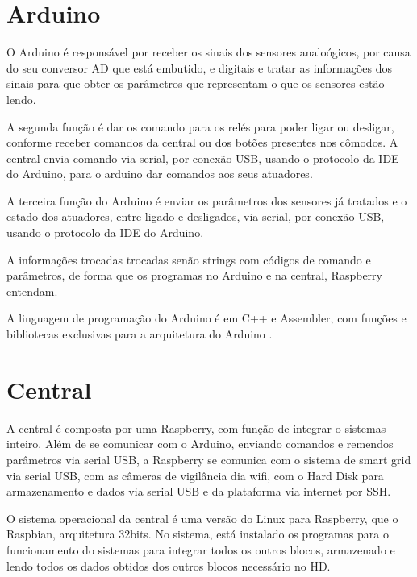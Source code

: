\section{Arduino}
\par O Arduino é responsável por receber os sinais dos sensores analoógicos, por causa do seu conversor AD que está embutido, e digitais e tratar as informações dos sinais para que obter os parâmetros que representam o que os sensores estão lendo.
\par A segunda função é dar os comando para os relés para poder ligar ou desligar, conforme receber comandos da central ou dos botões presentes nos cômodos. A central envia comando via serial, por conexão USB, usando o protocolo da IDE do Arduino, para o arduino dar comandos aos seus atuadores.
\par A terceira função do Arduino é enviar os parâmetros dos sensores já tratados e o estado dos atuadores, entre ligado e desligados, via serial, por conexão USB, usando o protocolo da IDE do Arduino.
\par A informações trocadas trocadas senão strings com códigos de comando e parâmetros, de forma que os programas no Arduino e na central, Raspberry entendam.
\par A linguagem de programação do Arduino é em C++ e Assembler, com funções e bibliotecas exclusivas para a arquitetura do Arduino .

\section{Central}
\par A central é composta por uma Raspberry, com função de integrar o sistemas inteiro. Além de se comunicar com o Arduino, enviando comandos e remendos parâmetros via serial USB, a Raspberry se comunica com o sistema de smart grid via serial USB, com as câmeras de vigilância dia wifi, com o Hard Disk para armazenamento e dados via serial USB e da plataforma via internet por SSH.
\par O sistema operacional da central é uma versão do Linux para Raspberry, que o Raspbian, arquitetura 32bits. No sistema, está instalado os programas para o funcionamento do sistemas para integrar todos os outros blocos, armazenado e lendo todos os dados obtidos dos outros blocos necessário no HD.

